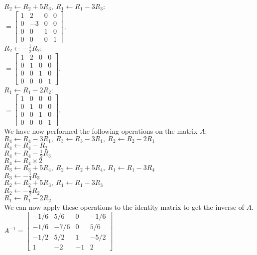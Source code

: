 \documentclass[a4paper]{article}
\begin{document}
\begin{enumerate}
$R_2 \leftarrow R_2 + 5R_3,\ R_1 \leftarrow R_1 - 3R_3$:\\
$= \begin{bmatrix}1 & 2 & 0 & 0\\0 & -3 & 0 & 0\\0 & 0 & 1 & 0\\0 & 0 & 0 & 1\end{bmatrix}$.\\

$R_2 \leftarrow -\frac{1}{2}R_2$:\\
$= \begin{bmatrix}1 & 2 & 0 & 0\\0 & 1 & 0 & 0\\0 & 0 & 1 & 0\\0 & 0 & 0 & 1\end{bmatrix}$.\\

$R_1 \leftarrow R_1 - 2R_2$:\\
$= \begin{bmatrix}1 & 0 & 0 & 0\\0 & 1 & 0 & 0\\0 & 0 & 1 & 0\\0 & 0 & 0 & 1\end{bmatrix}$.\\

We have now performed the following operations on the matrix $A$:\\
$R_4 \leftarrow R_4 - 3R_1,\ R_3 \leftarrow R_3 - 3R_1,\ R_2 \leftarrow R_2 - 2R_1$\\
$R_4 \leftarrow R_4 - R_2$\\
$R_4 \leftarrow R_4 - \frac{1}{2}R_3$\\
$R_4 \leftarrow R_4 \times 2$\\
$R_3 \leftarrow R_3 + 5R_4,\ R_2 \leftarrow R_2 + 5R_4,\ R_1 \leftarrow R_1 -3R_4$\\
$R_3 \leftarrow - \frac{1}{4}R_3$\\
$R_2 \leftarrow R_2 + 5R_3,\ R_1 \leftarrow R_1 - 3R_3$\\
$R_2 \leftarrow -\frac{1}{2}R_2$\\
$R_1 \leftarrow R_1 - 2R_2$\\

We can now apply these operations to the identity matrix to get the inverse of $A$.\\

$A^{-1} = 
\begin{bmatrix}
    -1/6 & 5/6 & 0 & -1/6\\
    -1/6 & -7/6 & 0 & 5/6\\
    -1/2 & 5/2 & 1 & -5/2\\
    1 & -2 & -1 & 2
\end{bmatrix}
$


\end{enumerate}
\end{document}
